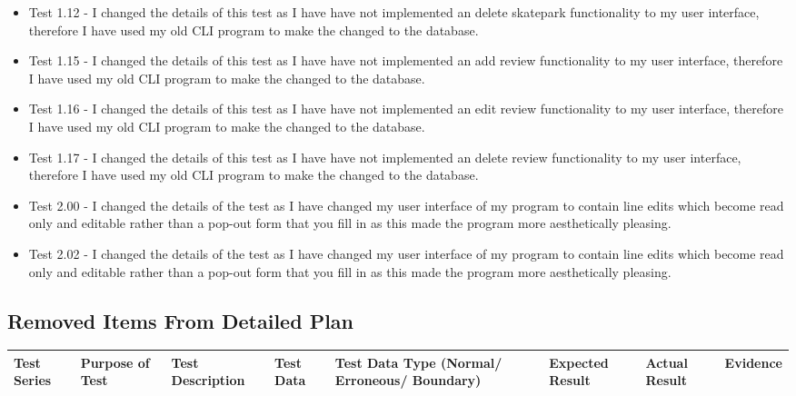 \begin{landscape}
\begin{itemize}
\item Test 1.12 -  I changed the details of this test as I have have not implemented an delete skatepark functionality to my user interface, therefore I have used my old CLI program to make the changed to the database. 

\item Test 1.15 - I changed the details of this test as I have have not implemented an add review functionality to my user interface, therefore I have used my old CLI program to make the changed to the database. 


\item Test 1.16 - I changed the details of this test as I have have not implemented an edit review functionality to my user interface, therefore I have used my old CLI program to make the changed to the database. 


\item Test 1.17 - I changed the details of this test as I have have not implemented an delete review functionality to my user interface, therefore I have used my old CLI program to make the changed to the database. 


\item Test 2.00 -  I changed the details of the test as I have changed my user interface of my program to contain line edits which become read only and editable rather than a pop-out form that you fill in as this made the program more aesthetically pleasing.

\item Test 2.02 - I changed the details of the test as I have changed my user interface of my program to contain line edits which become read only and editable rather than a pop-out form that you fill in as this made the program more aesthetically pleasing.

\end{itemize}










\subsection{Removed Items From Detailed Plan}

\begin{center}
    \begin{longtable}{|p{1.5cm}|p{2.5cm}|p{2.5cm}|p{2cm}|p{2cm}|p{2cm}|p{2cm}|p{2cm}|}
        \hline
        \textbf{Test Series} & \textbf{Purpose of Test} & \textbf{Test Description} & \textbf{Test Data} & \textbf{Test Data Type (Normal/ Erroneous/ Boundary)} & \textbf{Expected Result} & \textbf{Actual Result} & \textbf{Evidence}\\ \hline







\end{longtable}
\end{center}
\end{landscape}
